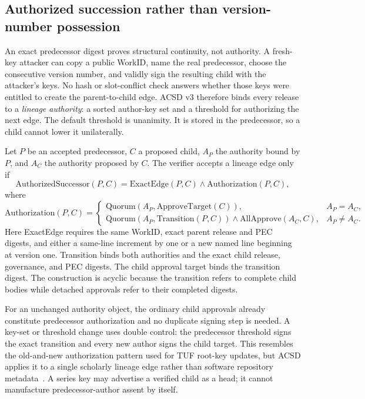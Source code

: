\documentclass[11pt]{article}
\begin{document}
\subsection{Authorized succession rather than version-number possession}

An exact predecessor digest proves structural continuity, not authority. A
fresh-key attacker can copy a public WorkID, name the real predecessor, choose
the consecutive version number, and validly sign the resulting child with the
attacker's keys. No hash or slot-conflict check answers whether those keys were
entitled to create the parent-to-child edge. ACSD v3 therefore binds every
release to a \emph{lineage authority}: a sorted author-key set and a threshold
for authorizing the next edge. The default threshold is unanimity. It is stored
in the predecessor, so a child cannot lower it unilaterally.

Let $P$ be an accepted predecessor, $C$ a proposed child, $A_P$ the authority
bound by $P$, and $A_C$ the authority proposed by $C$. The verifier accepts a
lineage edge only if
\[
 \mathrm{AuthorizedSuccessor}(P,C) = \mathrm{ExactEdge}(P,C) \land
 \mathrm{Authorization}(P,C),
\]
where
\[
 \mathrm{Authorization}(P,C)=
 \begin{cases}
  \mathrm{Quorum}(A_P,\mathrm{ApproveTarget}(C)), & A_P=A_C,\\
  \mathrm{Quorum}(A_P,\mathrm{Transition}(P,C)) \land
  \mathrm{AllApprove}(A_C,C), & A_P\ne A_C.
 \end{cases}
\]
Here \textsf{ExactEdge} requires the same WorkID, exact parent release and PEC
digests, and either a same-line increment by one or a new named line beginning
at version one. \textsf{Transition} binds both authorities and the exact child
release, governance, and PEC digests. The child approval target binds the
transition digest. The construction is acyclic because the transition refers
to complete child bodies while detached approvals refer to their completed
digests.

For an unchanged authority object, the ordinary child approvals already constitute
predecessor authorization and no duplicate signing step is needed. A key-set or
threshold change uses double control: the predecessor threshold signs the exact
transition and every new author signs the child target. This resembles the
old-and-new authorization pattern used for TUF root-key updates, but ACSD
applies it to a single scholarly lineage edge rather than software repository
metadata~\cite{tufspec}. A series key may advertise a verified child as a head;
it cannot manufacture predecessor-author assent by itself.
\end{document}
